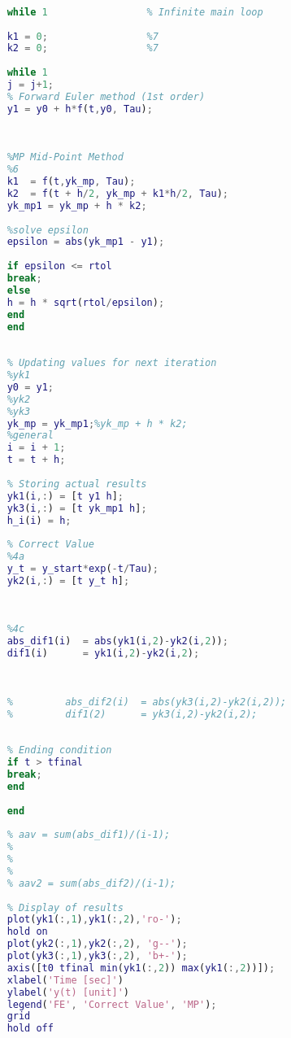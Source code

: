 \begin{appendices}
\begin{lstlisting}[caption={$test\_ode1$}, language=matlab, backgroundcolor = \color{lgray}, label={lst:ode12}]
	
	
	while 1                 % Infinite main loop
	
	k1 = 0;                 %7
	k2 = 0;                 %7
	
	while 1
	j = j+1;
	% Forward Euler method (1st order)
	y1 = y0 + h*f(t,y0, Tau);
	
	
	
	%MP Mid-Point Method 
	%6
	k1  = f(t,yk_mp, Tau);
	k2  = f(t + h/2, yk_mp + k1*h/2, Tau);  
	yk_mp1 = yk_mp + h * k2;
	
	%solve epsilon
	epsilon = abs(yk_mp1 - y1);
	
	if epsilon <= rtol
	break;
	else 
	h = h * sqrt(rtol/epsilon);
	end      
	end
	
	
	% Updating values for next iteration
	%yk1
	y0 = y1;            
	%yk2
	%yk3      
	yk_mp = yk_mp1;%yk_mp + h * k2;
	%general
	i = i + 1;
	t = t + h;
	
	% Storing actual results
	yk1(i,:) = [t y1 h];
	yk3(i,:) = [t yk_mp1 h];
	h_i(i) = h;
	
	% Correct Value
	%4a
	y_t = y_start*exp(-t/Tau);
	yk2(i,:) = [t y_t h]; 
	
	
	
	%4c
	abs_dif1(i)  = abs(yk1(i,2)-yk2(i,2));
	dif1(i)      = yk1(i,2)-yk2(i,2);
	
	
	
	%         abs_dif2(i)  = abs(yk3(i,2)-yk2(i,2));
	%         dif1(2)      = yk3(i,2)-yk2(i,2);
	
	
	% Ending condition
	if t > tfinal
	break;
	end 
	
	end
	
	% aav = sum(abs_dif1)/(i-1);
	% 
	% 
	% 
	% aav2 = sum(abs_dif2)/(i-1);
	
	% Display of results
	plot(yk1(:,1),yk1(:,2),'ro-');
	hold on
	plot(yk2(:,1),yk2(:,2), 'g--');
	plot(yk3(:,1),yk3(:,2), 'b+-');
	axis([t0 tfinal min(yk1(:,2)) max(yk1(:,2))]);
	xlabel('Time [sec]')
	ylabel('y(t) [unit]')
	legend('FE', 'Correct Value', 'MP');
	grid
	hold off
\end{lstlisting}	
		
\end{appendices}